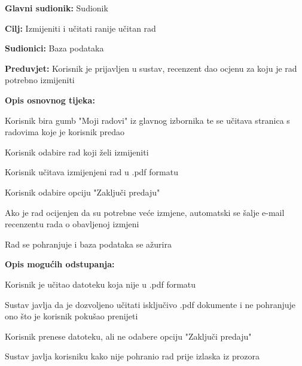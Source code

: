 					\noindent {}
					\begin{packed_item}
						\item \textbf{Glavni sudionik:} Sudionik
						\item \textbf{Cilj:} Izmijeniti i učitati ranije učitan rad
						\item \textbf{Sudionici:} Baza podataka
						\item \textbf{Preduvjet:} Korisnik je prijavljen u sustav, recenzent dao ocjenu za koju je rad potrebno izmijeniti
						
						\item \textbf{Opis osnovnog tijeka:} 
						\item[] \begin{packed_enum}
							\item Korisnik bira gumb "Moji radovi" iz glavnog izbornika te se učitava stranica s radovima koje je korisnik predao
							\item Korisnik odabire rad koji želi izmijeniti
							\item Korisnik učitava izmijenjeni rad u .pdf formatu
							\item Korisnik odabire opciju "Zaključi predaju"
							\item Ako je rad ocijenjen da su potrebne veće izmjene, automatski se šalje e-mail recenzentu rada o obavljenoj izmjeni
							\item Rad se pohranjuje i baza podataka se ažurira
						\end{packed_enum}
					
						\item \textbf{Opis mogućih odstupanja:}
						\item[] \begin{packed_enum}
							\item[2.a] Korisnik je učitao datoteku koja nije u .pdf formatu
							\item[] \begin{packed_enum}
								\item[1.] Sustav javlja da je dozvoljeno učitati isključivo .pdf dokumente i ne pohranjuje ono što je korisnik pokušao prenijeti
							\end{packed_enum}
						
							\item[2.b] Korisnik prenese datoteku, ali ne odabere opciju "Zaključi predaju"
							\item[] \begin{packed_enum}
								\item[1.] Sustav javlja korisniku kako nije pohranio rad prije izlaska iz prozora
							\end{packed_enum}
							
						\end{packed_enum}
					\end{packed_item}
					
